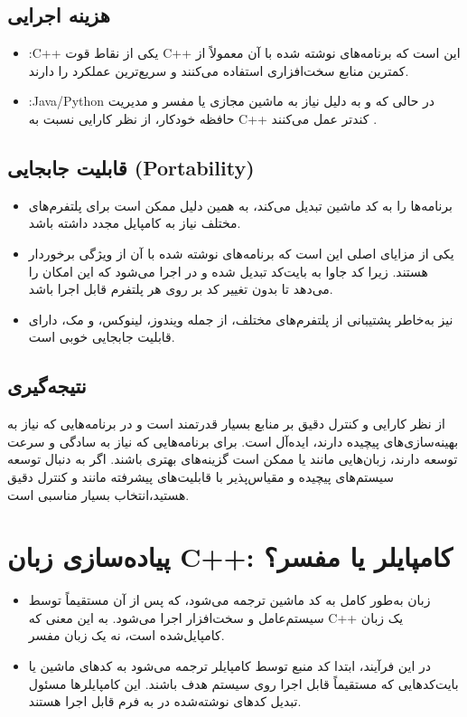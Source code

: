 \documentclass[12pt, a4paper]{report}
\begin{document}
\subsection{ هزینه اجرایی  }
\begin{itemize}
	\item
:C++ یکی از نقاط قوت C++ این است که برنامه‌های نوشته شده با آن معمولاً از کمترین منابع سخت‌افزاری استفاده می‌کنند و سریع‌ترین عملکرد را دارند.
\item
:Java/Python  در حالی که   و به دلیل نیاز به ماشین مجازی یا مفسر و مدیریت حافظه خودکار، از نظر کارایی نسبت به C++ کندتر عمل می‌کنند
.
\end{itemize}
\subsection{ قابلیت جابجایی  (Portability)}
\begin{itemize}
	\item
{}  برنامه‌ها را به کد ماشین تبدیل می‌کند، به همین دلیل ممکن است برای پلتفرم‌های مختلف نیاز به کامپایل مجدد داشته باشد.
	\item
{}یکی از مزایای اصلی  این است که برنامه‌های نوشته شده با آن از ویژگی  برخوردار هستند.
 زیرا کد جاوا به بایت‌کد تبدیل شده و در   اجرا می‌شود که این امکان را می‌دهد تا بدون تغییر کد بر روی هر پلتفرم قابل اجرا باشد.
 	\item
{}   نیز به‌خاطر پشتیبانی از پلتفرم‌های مختلف، از جمله ویندوز، لینوکس، و مک، دارای قابلیت جابجایی خوبی است.
\end{itemize}
\subsection{نتیجه‌گیری}
از نظر کارایی و کنترل دقیق بر منابع بسیار قدرتمند است و در برنامه‌هایی که نیاز به بهینه‌سازی‌های پیچیده دارند، ایده‌آل است.
برای برنامه‌هایی که نیاز به سادگی و سرعت توسعه دارند، زبان‌هایی مانند   یا   ممکن است گزینه‌های بهتری باشند.
اگر به دنبال توسعه سیستم‌های پیچیده و مقیاس‌پذیر با قابلیت‌های پیشرفته مانند  و کنترل دقیق هستید،انتخاب بسیار مناسبی است.
\section{پیاده‌سازی زبان C++: کامپایلر یا مفسر؟}
\begin{itemize}
	 	\item
	زبان  به‌طور کامل به کد ماشین ترجمه می‌شود، که پس از آن مستقیماً توسط سیستم‌عامل و سخت‌افزار اجرا می‌شود. به این معنی که C++  یک زبان کامپایل‌شده است، نه یک زبان مفسر.
	 	\item
	در این فرآیند، ابتدا کد منبع  توسط کامپایلر ترجمه می‌شود به کدهای ماشین یا بایت‌کدهایی که مستقیماً قابل اجرا روی سیستم هدف باشند. این کامپایلرها مسئول تبدیل کدهای نوشته‌شده در به فرم قابل اجرا هستند.
\end{itemize}
\end{document}

